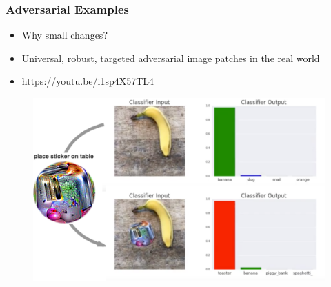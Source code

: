 \documentclass{beamer}
\begin{document}
\begin{frame}
\frametitle{Adversarial Examples}
\begin{itemize}
\item Why small changes?
\item Universal, robust, targeted adversarial image patches in the real world \cite{Brown2017}
\item \url{https://youtu.be/i1sp4X57TL4}
\end{itemize}
\begin{figure}
  \includegraphics[width=.7\textwidth]{banana.png}
\end{figure}
\end{frame}
\end{document}

